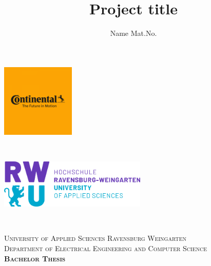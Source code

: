 \documentclass[a4paper,11pt,singlespacing]{article}
\title{Project title}
\author{
	Name Mat.No.
	}
\begin{document}
\setlength{\parindent}{0ex}

\begin{titlepage}
	
	
	\begin{minipage}{0.4\textwidth}
		\begin{flushleft} \large
			\includegraphics[width=3.5cm]{./Images/conti_logo.png} %
		\end{flushleft}
	\end{minipage}
	~
	\begin{minipage}{0.5\textwidth}
		\begin{flushright} \large
			\includegraphics[width=7cm]{./Images/logo.png} %
		\end{flushright}
	\end{minipage}\\[2cm]
	
	
	\newcommand{\HRule}{\rule{\linewidth}{0.5mm}} %
	
	\center %
	
	
	\textsc{\LARGE University of Applied Sciences Ravensburg Weingarten}\\[1.5cm] %
	\textsc{\Large Department of
		Electrical Engineering
		and Computer Science}\\[0.5cm] %
	\textsc{\large  \textbf{Bachelor Thesis}}\\[0.5cm] %
	

\end{titlepage}
\end{document}
